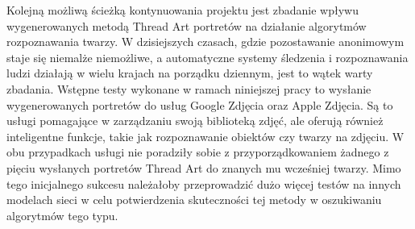     Kolejną możliwą ścieżką kontynuowania projektu jest zbadanie wpływu wygenerowanych metodą Thread Art portretów na działanie algorytmów rozpoznawania twarzy. W dzisiejszych czasach, gdzie pozostawanie anonimowym staje się niemalże niemożliwe, a automatyczne systemy śledzenia i rozpoznawania ludzi działają w wielu krajach na porządku dziennym, jest to wątek warty zbadania. Wstępne testy wykonane w ramach niniejszej pracy to wysłanie wygenerowanych portretów do usług Google Zdjęcia oraz Apple Zdjęcia. Są to usługi pomagające w zarządzaniu swoją biblioteką zdjęć, ale oferują również inteligentne funkcje, takie jak rozpoznawanie obiektów czy twarzy na zdjęciu. W obu przypadkach usługi nie poradziły sobie z przyporządkowaniem żadnego z pięciu wysłanych portretów Thread Art do znanych mu wcześniej twarzy. Mimo tego inicjalnego sukcesu należałoby przeprowadzić dużo więcej testów na innych modelach sieci w celu potwierdzenia skuteczności tej metody w oszukiwaniu algorytmów tego typu.
        
\printbibliography[heading=bibintoc,title={Bibliografia}]

\listoffigures

\listofcodes

\renewcommand{\listtablename}{Spis tabel}
\listoftables
